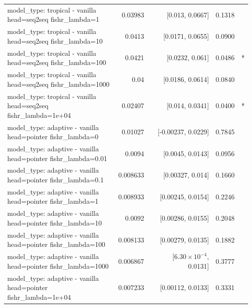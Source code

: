 \documentclass[10pt]{article}
\makeatletter
\newcommand{\stackcell}[1]{\begin{tabular}[t]{@{}l@{}}#1\end{tabular}}
\makeatother
\begin{document}
{\begin{longtable}{lrrrl}
\stackcell{model\_type: tropical - vanilla\\\footnotesize head=seq2seq fishr\_lambda=1 } & 0.03983 & [0.013, 0.0667] & 0.1318 & \\
\stackcell{model\_type: tropical - vanilla\\\footnotesize head=seq2seq fishr\_lambda=10 } & 0.0413 & [0.0171, 0.0655] & 0.0900 & \\
\stackcell{model\_type: tropical - vanilla\\\footnotesize head=seq2seq fishr\_lambda=100 } & 0.0421 & [0.0232, 0.061] & 0.0486 & *\\
\stackcell{model\_type: tropical - vanilla\\\footnotesize head=seq2seq fishr\_lambda=1000 } & 0.04 & [0.0186, 0.0614] & 0.0840 & \\
\stackcell{model\_type: tropical - vanilla\\\footnotesize head=seq2seq fishr\_lambda=1e+04 } & 0.02407 & [0.014, 0.0341] & 0.0400 & *\\
\stackcell{model\_type: adaptive - vanilla\\\footnotesize head=pointer fishr\_lambda=0 } & 0.01027 & [-0.00237, 0.0229] & 0.7845 & \\
\stackcell{model\_type: adaptive - vanilla\\\footnotesize head=pointer fishr\_lambda=0.01 } & 0.0094 & [0.0045, 0.0143] & 0.0956 & \\
\stackcell{model\_type: adaptive - vanilla\\\footnotesize head=pointer fishr\_lambda=0.1 } & 0.008633 & [0.00327, 0.014] & 0.1660 & \\
\stackcell{model\_type: adaptive - vanilla\\\footnotesize head=pointer fishr\_lambda=1 } & 0.008933 & [0.00245, 0.0154] & 0.2246 & \\
\stackcell{model\_type: adaptive - vanilla\\\footnotesize head=pointer fishr\_lambda=10 } & 0.0092 & [0.00286, 0.0155] & 0.2048 & \\
\stackcell{model\_type: adaptive - vanilla\\\footnotesize head=pointer fishr\_lambda=100 } & 0.008133 & [0.00279, 0.0135] & 0.1882 & \\
\stackcell{model\_type: adaptive - vanilla\\\footnotesize head=pointer fishr\_lambda=1000 } & 0.006867 & [$6.30\times10^{-4}$, 0.0131] & 0.3777 & \\
\stackcell{model\_type: adaptive - vanilla\\\footnotesize head=pointer fishr\_lambda=1e+04 } & 0.007233 & [0.00112, 0.0133] & 0.3331 & \\

\end{longtable}}
\end{document}
